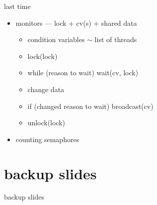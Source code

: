 \date{}
\title{}
\date{}

\begin{frame}
    \titlepage
\end{frame}

\begin{frame}{last time}
    \begin{itemize}
    \item monitors  --- lock + cv(s) + shared data
        \begin{itemize}
        \item condition variables $\sim$ list of threads
        \item lock(lock)
        \item while (reason to wait) wait(cv, lock)
        \item change data
        \item if (changed reason to wait) broadcast(cv)
        \item unlock(lock)
        \end{itemize}
    \item counting semaphores 
    \end{itemize}
\end{frame}





\section{backup slides}
\begin{frame}{backup slides}
\end{frame}





